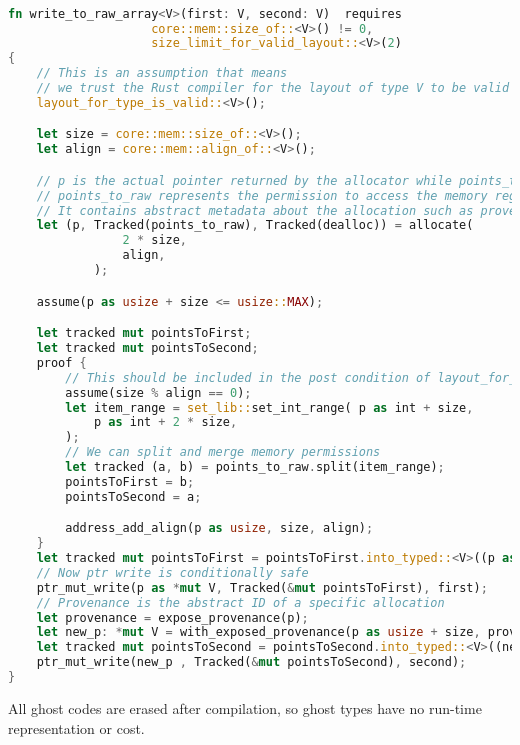 \documentclass[conference]{IEEEtran}
\begin{document}
\begin{lstlisting}[language=Rust,style=colouredRust, caption={a pedagogical example showcasing how ghost memory permission converts unsafe raw pointer operation to safe code}, label = {9}]

fn write_to_raw_array<V>(first: V, second: V)  requires 
                    core::mem::size_of::<V>() != 0, 
                    size_limit_for_valid_layout::<V>(2)
{
    // This is an assumption that means 
    // we trust the Rust compiler for the layout of type V to be valid
    layout_for_type_is_valid::<V>();

    let size = core::mem::size_of::<V>();
    let align = core::mem::align_of::<V>();

    // p is the actual pointer returned by the allocator while points_to_raw and dealloc are ghost.
    // points_to_raw represents the permission to access the memory region pointed to by p 
    // It contains abstract metadata about the allocation such as provenance, size, alignment and memory value
    let (p, Tracked(points_to_raw), Tracked(dealloc)) = allocate(
                2 * size,
                align,
            );

    assume(p as usize + size <= usize::MAX);

    let tracked mut pointsToFirst;
    let tracked mut pointsToSecond;
    proof {
        // This should be included in the post condition of layout_for_type_is_valid
        assume(size % align == 0);
        let item_range = set_lib::set_int_range( p as int + size,
            p as int + 2 * size,
        );
        // We can split and merge memory permissions 
        let tracked (a, b) = points_to_raw.split(item_range);
        pointsToFirst = b;
        pointsToSecond = a;

        address_add_align(p as usize, size, align);
    }
    let tracked mut pointsToFirst = pointsToFirst.into_typed::<V>((p as usize) as usize);
    // Now ptr write is conditionally safe
    ptr_mut_write(p as *mut V, Tracked(&mut pointsToFirst), first);
    // Provenance is the abstract ID of a specific allocation
    let provenance = expose_provenance(p);
    let new_p: *mut V = with_exposed_provenance(p as usize + size, provenance);
    let tracked mut pointsToSecond = pointsToSecond.into_typed::<V>((new_p as usize) as usize);
    ptr_mut_write(new_p , Tracked(&mut pointsToSecond), second);
}
\end{lstlisting}
All ghost codes are erased after compilation, so ghost types have no run-time representation or cost.
\end{document}
